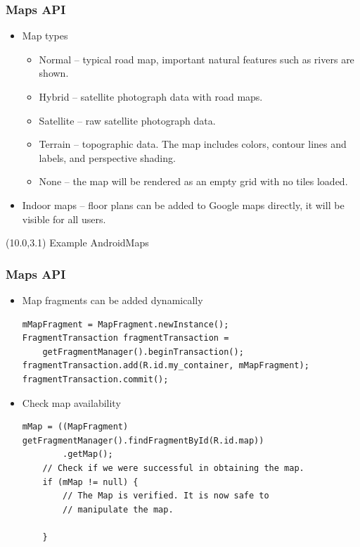 \documentclass[10pt,xcolor=pdflatex]{beamer}
\begin{document}
\begin{frame}[fragile]\frametitle{Maps API}
\begin{itemize}
	\item Map types
	  \begin{itemize}
		\item Normal -- typical road map, important natural features such as rivers are shown.
		\item Hybrid -- satellite photograph data with road maps.
		\item Satellite -- raw satellite photograph data.
		\item Terrain -- topographic data. The map includes colors, contour lines and labels, and perspective shading.
		\item None -- the map will be rendered as an empty grid with no tiles loaded.
	  \end{itemize}
    \item Indoor maps -- floor plans can be added to Google maps directly, it will be visible for all users.
\end{itemize}
\begin{textblock}{15}(10.0,3.1)
    {\footnotesize Example AndroidMaps}
\end{textblock}
\end{frame}

\begin{frame}[fragile]\frametitle{Maps API}
  \begin{itemize}
	\item Map fragments can be added dynamically
	  \lstset{language=Java, basicstyle=\footnotesize\ttfamily}
      \begin{lstlisting}
mMapFragment = MapFragment.newInstance();
FragmentTransaction fragmentTransaction =
    getFragmentManager().beginTransaction();
fragmentTransaction.add(R.id.my_container, mMapFragment);
fragmentTransaction.commit();
\end{lstlisting} 
    \item Check map availability
      \lstset{language=Java, basicstyle=\footnotesize\ttfamily}
      \begin{lstlisting}
mMap = ((MapFragment) getFragmentManager().findFragmentById(R.id.map))
        .getMap();
    // Check if we were successful in obtaining the map.
    if (mMap != null) {
        // The Map is verified. It is now safe to 
        // manipulate the map.

    }
\end{lstlisting} 
\end{itemize}
\end{frame}
\end{document}
